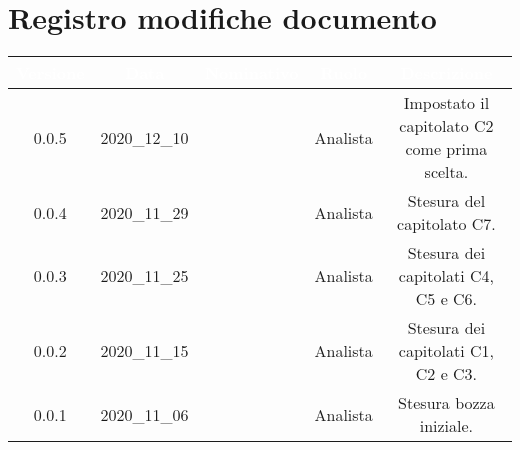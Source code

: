 \section*{Registro modifiche documento}
{
\renewcommand{\arraystretch}{1.5}
\centering
\begin{longtable}{c c C{2.3cm} c c}


 \textcolor{white}{\textbf{Versione}} &
    \textcolor{white}{\textbf{Data}} &
    \textcolor{white}{\textbf{Nominativo}} &
    \textcolor{white}{\textbf{Ruolo}} &
    \textcolor{white}{\textbf{Descrizione}}\\	
    \endhead
    
    0.0.5 & 2020\_12\_10 & \FF{} & Analista & Impostato il capitolato C2 come prima scelta.  \\

    0.0.4 & 2020\_11\_29 & \FF{} & Analista & Stesura del capitolato C7.  \\
    
    0.0.3 & 2020\_11\_25 & \FF{} & Analista & Stesura dei capitolati C4, C5 e C6.  \\
    
    0.0.2 & 2020\_11\_15 & \FF{} & Analista & Stesura dei capitolati C1, C2 e C3.  \\
            
    0.0.1 & 2020\_11\_06 & \FF{} & Analista & Stesura bozza iniziale.  \\
			
\end{longtable}
}